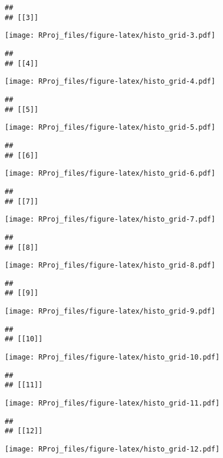 \documentclass[
]{article}
\begin{document}
\begin{verbatim}
## 
## [[3]]
\end{verbatim}

\texttt{[image: RProj\_files/figure-latex/histo\_grid-3.pdf]}

\begin{verbatim}
## 
## [[4]]
\end{verbatim}

\texttt{[image: RProj\_files/figure-latex/histo\_grid-4.pdf]}

\begin{verbatim}
## 
## [[5]]
\end{verbatim}

\texttt{[image: RProj\_files/figure-latex/histo\_grid-5.pdf]}

\begin{verbatim}
## 
## [[6]]
\end{verbatim}

\texttt{[image: RProj\_files/figure-latex/histo\_grid-6.pdf]}

\begin{verbatim}
## 
## [[7]]
\end{verbatim}

\texttt{[image: RProj\_files/figure-latex/histo\_grid-7.pdf]}

\begin{verbatim}
## 
## [[8]]
\end{verbatim}

\texttt{[image: RProj\_files/figure-latex/histo\_grid-8.pdf]}

\begin{verbatim}
## 
## [[9]]
\end{verbatim}

\texttt{[image: RProj\_files/figure-latex/histo\_grid-9.pdf]}

\begin{verbatim}
## 
## [[10]]
\end{verbatim}

\texttt{[image: RProj\_files/figure-latex/histo\_grid-10.pdf]}

\begin{verbatim}
## 
## [[11]]
\end{verbatim}

\texttt{[image: RProj\_files/figure-latex/histo\_grid-11.pdf]}

\begin{verbatim}
## 
## [[12]]
\end{verbatim}

\texttt{[image: RProj\_files/figure-latex/histo\_grid-12.pdf]}
\end{document}
